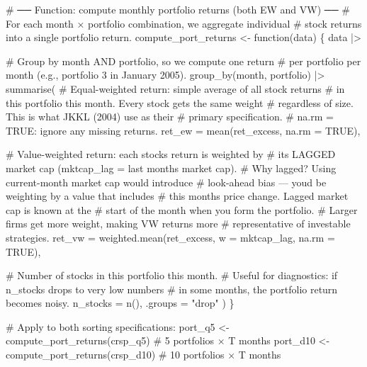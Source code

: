 \documentclass[
  letterpaper,
  DIV=11,
  numbers=noendperiod]{scrartcl}
\newenvironment{Shaded}{\begin{snugshade}}{\end{snugshade}}
\newcommand{\AttributeTok}[1]{\textcolor[rgb]{0.40,0.45,0.13}{#1}}
\newcommand{\CommentTok}[1]{\textcolor[rgb]{0.37,0.37,0.37}{#1}}
\newcommand{\ConstantTok}[1]{\textcolor[rgb]{0.56,0.35,0.01}{#1}}
\newcommand{\ControlFlowTok}[1]{\textcolor[rgb]{0.00,0.23,0.31}{#1}}
\newcommand{\FunctionTok}[1]{\textcolor[rgb]{0.28,0.35,0.67}{#1}}
\newcommand{\NormalTok}[1]{\textcolor[rgb]{0.00,0.23,0.31}{#1}}
\newcommand{\OtherTok}[1]{\textcolor[rgb]{0.00,0.23,0.31}{#1}}
\newcommand{\SpecialCharTok}[1]{\textcolor[rgb]{0.37,0.37,0.37}{#1}}
\newcommand{\StringTok}[1]{\textcolor[rgb]{0.13,0.47,0.30}{#1}}
\begin{document}
\begin{Shaded}
\begin{Highlighting}[]
\CommentTok{\# ── Function: compute monthly portfolio returns (both EW and VW) ──}
\CommentTok{\# For each month × portfolio combination, we aggregate individual}
\CommentTok{\# stock returns into a single portfolio return.}
\NormalTok{compute\_port\_returns }\OtherTok{\textless{}{-}} \ControlFlowTok{function}\NormalTok{(data) \{}
\NormalTok{  data }\SpecialCharTok{|\textgreater{}}
    
    \CommentTok{\# Group by month AND portfolio, so we compute one return}
    \CommentTok{\# per portfolio per month (e.g., portfolio 3 in January 2005).}
    \FunctionTok{group\_by}\NormalTok{(month, portfolio) }\SpecialCharTok{|\textgreater{}}
    \FunctionTok{summarise}\NormalTok{(}
      \CommentTok{\# Equal{-}weighted return: simple average of all stock returns}
      \CommentTok{\# in this portfolio this month. Every stock gets the same weight}
      \CommentTok{\# regardless of size. This is what JKKL (2004) use as their}
      \CommentTok{\# primary specification.}
      \CommentTok{\# na.rm = TRUE: ignore any missing returns.}
      \AttributeTok{ret\_ew =} \FunctionTok{mean}\NormalTok{(ret\_excess, }\AttributeTok{na.rm =} \ConstantTok{TRUE}\NormalTok{),}
      
      \CommentTok{\# Value{-}weighted return: each stock\textquotesingle{}s return is weighted by}
      \CommentTok{\# its LAGGED market cap (mktcap\_lag = last month\textquotesingle{}s market cap).}
      \CommentTok{\# Why lagged? Using current{-}month market cap would introduce}
      \CommentTok{\# look{-}ahead bias — you\textquotesingle{}d be weighting by a value that includes}
      \CommentTok{\# this month\textquotesingle{}s price change. Lagged market cap is known at the}
      \CommentTok{\# start of the month when you form the portfolio.}
      \CommentTok{\# Larger firms get more weight, making VW returns more}
      \CommentTok{\# representative of investable strategies.}
      \AttributeTok{ret\_vw =} \FunctionTok{weighted.mean}\NormalTok{(ret\_excess, }\AttributeTok{w =}\NormalTok{ mktcap\_lag, }\AttributeTok{na.rm =} \ConstantTok{TRUE}\NormalTok{),}
      
      \CommentTok{\# Number of stocks in this portfolio this month.}
      \CommentTok{\# Useful for diagnostics: if n\_stocks drops to very low numbers}
      \CommentTok{\# in some months, the portfolio return becomes noisy.}
      \AttributeTok{n\_stocks =} \FunctionTok{n}\NormalTok{(),}
      \AttributeTok{.groups =} \StringTok{"drop"}
\NormalTok{    )}
\NormalTok{\}}

\CommentTok{\# Apply to both sorting specifications:}
\NormalTok{port\_q5  }\OtherTok{\textless{}{-}} \FunctionTok{compute\_port\_returns}\NormalTok{(crsp\_q5)   }\CommentTok{\# 5 portfolios × T months}
\NormalTok{port\_d10 }\OtherTok{\textless{}{-}} \FunctionTok{compute\_port\_returns}\NormalTok{(crsp\_d10)  }\CommentTok{\# 10 portfolios × T months}
\end{Highlighting}
\end{Shaded}
\end{document}
